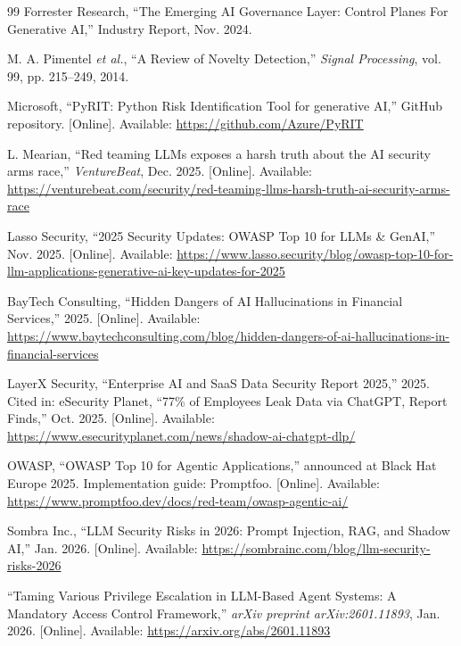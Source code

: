 \documentclass[12pt,a4paper]{article}
\begin{document}
\begin{thebibliography}{99}
Forrester Research, ``The Emerging AI Governance Layer: Control Planes For Generative AI,'' Industry Report, Nov. 2024.

M. A. Pimentel \textit{et al.}, ``A Review of Novelty Detection,'' \textit{Signal Processing}, vol. 99, pp. 215--249, 2014.

Microsoft, ``PyRIT: Python Risk Identification Tool for generative AI,'' GitHub repository. [Online]. Available: \url{https://github.com/Azure/PyRIT}

L. Mearian, ``Red teaming LLMs exposes a harsh truth about the AI security arms race,'' \textit{VentureBeat}, Dec. 2025. [Online]. Available: \url{https://venturebeat.com/security/red-teaming-llms-harsh-truth-ai-security-arms-race}

Lasso Security, ``2025 Security Updates: OWASP Top 10 for LLMs \& GenAI,'' Nov. 2025. [Online]. Available: \url{https://www.lasso.security/blog/owasp-top-10-for-llm-applications-generative-ai-key-updates-for-2025}

BayTech Consulting, ``Hidden Dangers of AI Hallucinations in Financial Services,'' 2025. [Online]. Available: \url{https://www.baytechconsulting.com/blog/hidden-dangers-of-ai-hallucinations-in-financial-services}

LayerX Security, ``Enterprise AI and SaaS Data Security Report 2025,'' 2025. Cited in: eSecurity Planet, ``77\% of Employees Leak Data via ChatGPT, Report Finds,'' Oct. 2025. [Online]. Available: \url{https://www.esecurityplanet.com/news/shadow-ai-chatgpt-dlp/}

OWASP, ``OWASP Top 10 for Agentic Applications,'' announced at Black Hat Europe 2025. Implementation guide: Promptfoo. [Online]. Available: \url{https://www.promptfoo.dev/docs/red-team/owasp-agentic-ai/}

Sombra Inc., ``LLM Security Risks in 2026: Prompt Injection, RAG, and Shadow AI,'' Jan. 2026. [Online]. Available: \url{https://sombrainc.com/blog/llm-security-risks-2026}

``Taming Various Privilege Escalation in LLM-Based Agent Systems: A Mandatory Access Control Framework,'' \textit{arXiv preprint arXiv:2601.11893}, Jan. 2026. [Online]. Available: \url{https://arxiv.org/abs/2601.11893}


\end{thebibliography}
\end{document}
